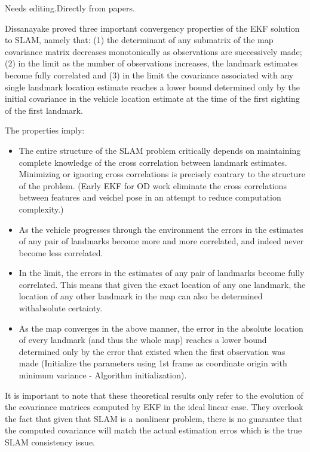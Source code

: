 Needs editing.Directly from papers.

Dissanayake proved three important convergency properties of the EKF 
solution to SLAM, namely that: (1) the determinant of any submatrix of 
the map covariance matrix decreases monotonically as observations are 
successively made; (2) in the limit as the number of observations 
increases, the landmark estimates become fully correlated and (3) in the 
limit the covariance associated with any single landmark location 
estimate reaches a lower bound determined only by the initial covariance 
in the vehicle location estimate at the time of the first sighting of 
the first landmark.

The properties imply:

\begin{itemize}
  \item The entire structure of the SLAM problem critically depends on 
  maintaining complete knowledge of the cross correlation between landmark 
  estimates. Minimizing or ignoring cross correlations is precisely 
  contrary to the structure of the problem. (Early EKF for OD work 
  eliminate the cross correlations between features and veichel pose in an 
  attempt to reduce computation complexity.)
  \item As the vehicle progresses through the environment the errors in 
  the estimates of any pair of landmarks become more and more correlated, 
  and indeed never become less correlated.
  \item In the limit, the errors in the estimates of any pair of landmarks 
  become fully correlated. This means that given the exact location of any 
  one landmark, the location of any other landmark in the map can also be 
  determined withabsolute certainty.
  \item As the map converges in the above manner, the error in the 
  absolute location of every landmark (and thus the whole map) reaches a 
  lower bound determined only by the error that existed when the first 
  observation was made (Initialize the parameters using 1st frame as 
  coordinate origin with minimum variance - Algorithm initialization).
\end{itemize}
It is important to note that these theoretical results only refer to the 
evolution of the covariance matrices computed by EKF in the ideal linear 
case. They overlook the fact that given that SLAM is a nonlinear 
problem, there is no guarantee that the computed covariance will match 
the actual estimation erros which is the true SLAM consistency issue. 

